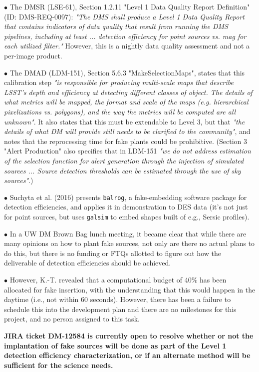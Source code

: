 $\bullet$ The DMSR (LSE-61), Section 1.2.11 "Level 1 Data Quality Report Definition" (ID: DMS-REQ-0097): \textit{"The DMS shall produce a Level 1 Data Quality Report that contains indicators of data quality that result from running the DMS pipelines, including at least ... detection efficiency for point sources vs. mag for each utilized filter."} However, this is a nightly data quality assessment and not a per-image product.

$\bullet$ The DMAD (LDM-151), Section 5.6.3 "MakeSelectionMaps", states that this calibration step \textit{"is responsible for producing multi-scale maps that describe LSST's depth and efficiency at detecting different classes of object. The details of what metrics will be mapped, the format and scale of the maps (e.g. hierarchical pixelizations vs. polygons), and the way the metrics will be computed are all unknown"}. It also states that this must be extendable to Level 3, but that \textit{"the details of what DM will provide still needs to be clarified to the community"}, and notes that the reprocessing time for fake plants could be prohibitive. (Section 3 "Alert Production" also specifies that in LDM-151 \textit{"we do not address estimation of the selection function for alert generation through the injection of simulated sources ... Source detection thresholds can be estimated through the use of sky sources"}.)

$\bullet$ Suchyta et al. (2016) presents \texttt{balrog}, a fake-embedding software package for detection efficiencies, and applies it in demonstration to DES data (it's not just for point sources, but uses \texttt{galsim} to embed shapes built of e.g., Sersic profiles).

$\bullet$ In a UW DM Brown Bag lunch meeting, it became clear that while there are many opinions on how to plant fake sources, not only are there no actual plans to do this, but there is no funding or FTQs allotted to figure out how the deliverable of detection efficiencies should be achieved.

$\bullet$ However, K.-T. revealed that a computational budget of 40\% has been allocated for fake insertion, with the understanding that this would happen in the daytime (i.e., not within 60 seconds). However, there has been a failure to schedule this into the development plan and there are no milestones for this project, and no person assigned to this task.

{\bf JIRA ticket DM-12584 is currently open to resolve whether or not the implantation of fake sources will be done as part of the Level 1 detection efficiency characterization, or if an alternate method will be sufficient for the science needs.}
